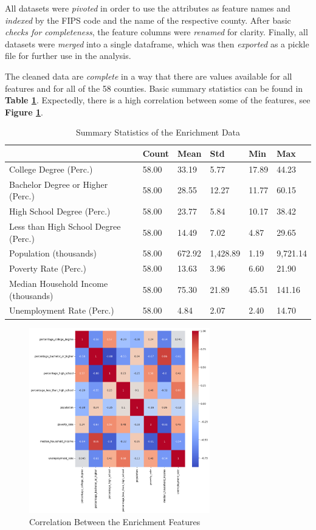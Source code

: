 All datasets were \textit{pivoted} in order to use the attributes as feature names and \textit{indexed} by the FIPS code and the name of the respective county. After basic \textit{checks for completeness}, the feature columns were \textit{renamed} for clarity. Finally, all datasets were \textit{merged} into a single dataframe, which was then \textit{exported} as a pickle file for further use in the analysis.


The cleaned data are \textit{complete} in a way that there are values available for all features and for all of the 58 counties. Basic summary statistics can be found in \textbf{Table \ref{tab:enrichment_summary}}. Expectedly, there is a high correlation between some of the features, see \textbf{Figure \ref{fig:CH03_Enrichment_Correlation}}.

\begin{table}[h]
    \centering
    \begin{tabularx}{\textwidth}{llllll}
    \hline
     & \textbf{Count} & \textbf{Mean} & \textbf{Std} & \textbf{Min} & \textbf{Max} \\
    \hline
    College Degree (Perc.) & 58.00 & 33.19 & 5.77 & 17.89 & 44.23 \\
    \hline
    Bachelor Degree or Higher (Perc.) & 58.00 & 28.55 & 12.27 & 11.77 & 60.15 \\
    \hline
    High School Degree (Perc.) & 58.00 & 23.77 & 5.84 & 10.17 & 38.42 \\
    \hline
    Less than High School Degree (Perc.) & 58.00 & 14.49 & 7.02 & 4.87 & 29.65 \\
    \hline
    Population (thousands) & 58.00 & 672.92 & 1,428.89 & 1.19 & 9,721.14 \\
    \hline
    Poverty Rate (Perc.) & 58.00 & 13.63 & 3.96 & 6.60 & 21.90 \\
    \hline
    Median Household Income (thousands) & 58.00 & 75.30 & 21.89 & 45.51 & 141.16 \\
    \hline
    Unemployment Rate (Perc.) & 58.00 & 4.84 & 2.07 & 2.40 & 14.70 \\
    \hline
    \end{tabularx}
    \caption{Summary Statistics of the Enrichment Data}
    \label{tab:enrichment_summary}
\end{table}

\begin{figure}[h]
    \centering
    \includegraphics[width=0.7\textwidth]{images/CH03_Enrichment_Correlation.png}
    \caption{Correlation Between the Enrichment Features}
    \label{fig:CH03_Enrichment_Correlation}
\end{figure}